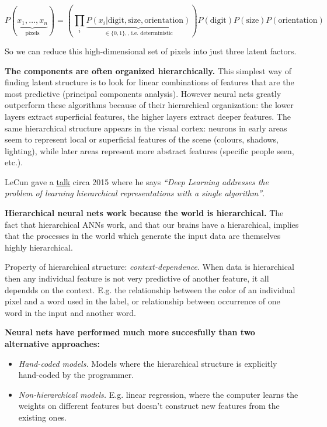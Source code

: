 \documentclass[
  11pt,
  letterpaper,
  DIV=11,
  numbers=noendperiod,
  oneside]{scrartcl}
\newcommand{\ut}[2]{\underbrace{#1}_{\text{#2}}}
\begin{document}
\[P(\ut{x_1,\ldots,x_n}{pixels})=( \prod_i \ut{P(x_i|\text{digit},\text{size},\text{orientation})}{$\in\{0,1\},$, i.e. deterministic}) P(\text{digit})P(\text{size})P(\text{orientation})\]

So we can reduce this high-dimensional set of pixels into just three
latent factors.

\textbf{The components are often organized hierarchically.} This
simplest way of finding latent structure is to look for linear
combinations of features that are the most predictive (principal
components analysis). However neural nets greatly outperform these
algorithms because of their hierarchical organization: the lower layers
extract superficial features, the higher layers extract deeper features.
The same hierarchical structure appears in the visual cortex: neurons in
early areas seem to represent local or superficial features of the scene
(colours, shadows, lighting), while later areas represent more abstract
features (specific people seen, etc.).

LeCun gave a
\href{http://matt.colorado.edu/compcogworkshop/talks/lecun.pdf}{talk}
circa 2015 where he says \emph{``Deep Learning addresses the problem of
learning hierarchical representations with a single algorithm''}.

\textbf{Hierarchical neural nets work because the world is
hierarchical.} The fact that hierarchical ANNs work, and that our brains
have a hierarchical, implies that the processes in the world which
generate the input data are themselves highly hierarchical.

Property of hierarchical structure: \emph{context-dependence}. When data
is hierarchical then any individual feature is not very predictive of
another feature, it all dependds on the context. E.g. the relationship
between the color of an individual pixel and a word used in the label,
or relationship between occurrence of one word in the input and another
word.

\textbf{Neural nets have performed much more succesfully than two
alternative approaches:}

\begin{itemize}
\item
  \emph{Hand-coded models.} Models where the hierarchical structure is
  explicitly hand-coded by the programmer.
\item
  \emph{Non-hierarchical models.} E.g. linear regression, where the
  computer learns the weights on different features but doesn't
  construct new features from the existing ones.
\end{itemize}
\end{document}
